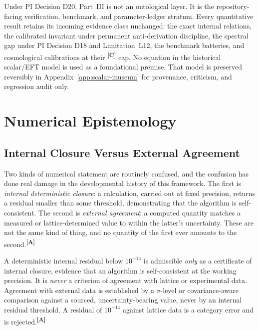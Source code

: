 \documentclass[12pt,a4paper,twoside]{article}
\theoremstyle{plain}
\theoremstyle{definition}
\theoremstyle{remark}
\newcommand{\catmark}[1]{\textsuperscript{\textsf{\textbf{[#1]}}}}
\begin{document}
\noindent Under PI Decision D20, Part~III is not an ontological layer. It is
the repository-facing verification, benchmark, and parameter-ledger stratum.
Every quantitative result retains its incoming evidence class unchanged: the
exact internal relations, the calibrated invariant under permanent
anti-derivation discipline, the spectral gap under PI Decision D18 and
Limitation~L12, the benchmark batteries, and cosmological calibrations at
their \catmark{C} cap. No equation in the historical scalar/EFT model is used
as a foundational premise. That model is preserved reversibly in
Appendix~\ref{app:scalar-museum} for provenance, criticism, and regression
audit only.



\section{Numerical Epistemology}
\label{sec:numerical-epistemology}

\subsection{Internal Closure Versus External Agreement}
\label{subsec:closure-vs-agreement}

Two kinds of numerical statement are routinely confused, and the
confusion has done real damage in the developmental history of this
framework. The first is \emph{internal deterministic closure}: a
calculation, carried out at fixed precision, returns a residual smaller
than some threshold, demonstrating that the algorithm is
self-consistent. The second is \emph{external agreement}: a computed
quantity matches a measured or lattice-determined value to within the
latter's uncertainty. These are not the same kind of thing, and no
quantity of the first ever amounts to the second.\catmark{A}

\begin{governancebox}
A deterministic internal residual below $10^{-14}$ is admissible
\emph{only} as a certificate of internal closure, evidence that an
algorithm is self-consistent at the working precision. It is
\emph{never} a criterion of agreement with lattice or experimental data.
Agreement with external data is established by a $\sigma$-level or
covariance-aware comparison against a sourced, uncertainty-bearing
value, never by an internal residual threshold. A residual of $10^{-14}$
against lattice data is a category error and is rejected.\catmark{A}
\end{governancebox}
\end{document}

